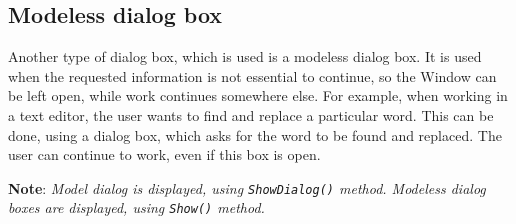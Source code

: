 \subsection{Modeless dialog box}
Another type of dialog box, which is used is a modeless dialog box. It is used when the requested
information is not essential to continue, so the Window can be left open, while work continues
somewhere else. For example, when working in a text editor, the user wants to find and replace a
particular word. This can be done, using a dialog box, which asks for the word to be found and
replaced. The user can continue to work, even if this box is open.

\noindent \textbf{Note}: \emph{Model dialog is displayed, using \texttt{ShowDialog()} method. Modeless dialog boxes are displayed, using \texttt{Show()} method.}
%
%
%

